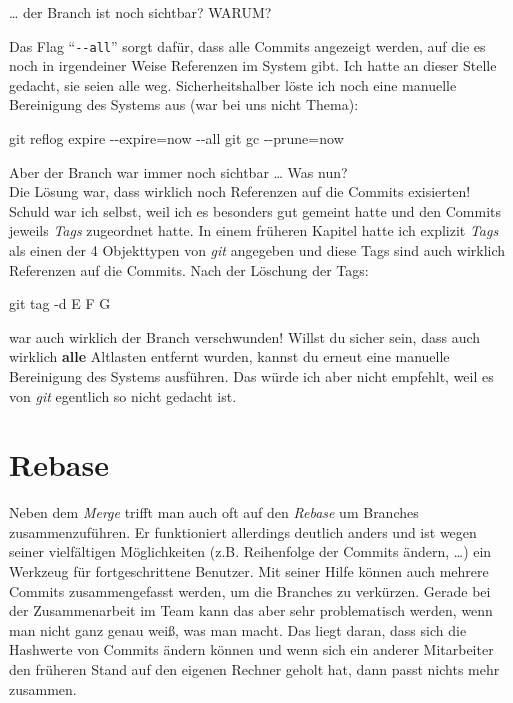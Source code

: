 \documentclass[
  ngerman,
  letterpaper,
  DIV=11]{scrreprt}
\newenvironment{Shaded}{\begin{snugshade}}{\end{snugshade}}
\newcommand{\AttributeTok}[1]{\textcolor[rgb]{0.40,0.45,0.13}{#1}}
\newcommand{\FunctionTok}[1]{\textcolor[rgb]{0.28,0.35,0.67}{#1}}
\newcommand{\NormalTok}[1]{\textcolor[rgb]{0.00,0.23,0.31}{#1}}
\newcommand{\OperatorTok}[1]{\textcolor[rgb]{0.37,0.37,0.37}{#1}}
\newcommand{\git}{\textit{git}\xspace}
\begin{document}
\ldots{} der Branch ist noch sichtbar? WARUM?

Das Flag ``\texttt{-\/-all}'' sorgt dafür, dass alle Commits angezeigt
werden, auf die es noch in irgendeiner Weise Referenzen im System gibt.
Ich hatte an dieser Stelle gedacht, sie seien alle weg.
Sicherheitshalber löste ich noch eine manuelle Bereinigung des Systems
aus (war bei uns nicht Thema):

\begin{Shaded}
\begin{Highlighting}[]
\FunctionTok{git}\NormalTok{ reflog expire }\AttributeTok{{-}{-}expire}\OperatorTok{=}\NormalTok{now }\AttributeTok{{-}{-}all}
\FunctionTok{git}\NormalTok{ gc }\AttributeTok{{-}{-}prune}\OperatorTok{=}\NormalTok{now}
\end{Highlighting}
\end{Shaded}

Aber der Branch war immer noch sichtbar \ldots{} Was nun?\\
Die Lösung war, dass wirklich noch Referenzen auf die Commits
exisierten! Schuld war ich selbst, weil ich es besonders gut gemeint
hatte und den Commits jeweils \emph{Tags} zugeordnet hatte. In einem
früheren Kapitel hatte ich explizit \emph{Tags} als einen der 4
Objekttypen von \git angegeben und diese Tags sind auch wirklich
Referenzen auf die Commits. Nach der Löschung der Tags:

\begin{Shaded}
\begin{Highlighting}[]
\FunctionTok{git}\NormalTok{ tag }\AttributeTok{{-}d}\NormalTok{ E F G}
\end{Highlighting}
\end{Shaded}

war auch wirklich der Branch verschwunden! Willst du sicher sein, dass
auch wirklich \textbf{alle} Altlasten entfernt wurden, kannst du erneut
eine manuelle Bereinigung des Systems ausführen. Das würde ich aber
nicht empfehlt, weil es von \git egentlich so nicht gedacht ist.

\section{Rebase}\label{rebase}

Neben dem \emph{Merge} trifft man auch oft auf den \emph{Rebase} um
Branches zusammenzuführen. Er funktioniert allerdings deutlich anders
und ist wegen seiner vielfältigen Möglichkeiten (z.B. Reihenfolge der
Commits ändern, \ldots) ein Werkzeug für fortgeschrittene Benutzer. Mit
seiner Hilfe können auch mehrere Commits zusammengefasst werden, um die
Branches zu verkürzen. Gerade bei der Zusammenarbeit im Team kann das
aber sehr problematisch werden, wenn man nicht ganz genau weiß, was man
macht. Das liegt daran, dass sich die Hashwerte von Commits ändern
können und wenn sich ein anderer Mitarbeiter den früheren Stand auf den
eigenen Rechner geholt hat, dann passt nichts mehr zusammen.
\end{document}
